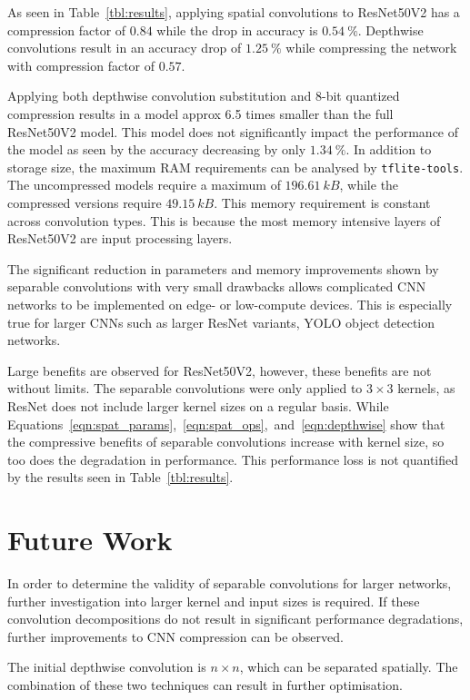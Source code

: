 \documentclass{article}
\begin{document}
	As seen in Table~\ref{tbl:results}, applying spatial convolutions to ResNet50V2 has a compression factor of $0.84$ while the drop in accuracy is $0.54~\%$. Depthwise convolutions result in an accuracy drop of $1.25~\%$ while compressing the network with compression factor of $0.57$.
	
	Applying both depthwise convolution substitution and 8-bit quantized compression results in a model approx 6.5 times smaller than the full ResNet50V2 model. This model does not significantly impact the performance of the model as seen by the accuracy decreasing by only $1.34~\%$. In addition to storage size, the maximum RAM requirements can be analysed by \verb|tflite-tools|. %
	The uncompressed models require a maximum of $196.61~kB$, while the compressed versions require $49.15~kB$. This memory requirement is constant across convolution types. This is because the most memory intensive layers of ResNet50V2 are input processing layers.
	
	The significant reduction in parameters and memory improvements shown by separable convolutions with very small drawbacks allows complicated CNN networks to be implemented on edge- or low-compute devices. This is especially true for larger CNNs such as larger ResNet variants, YOLO object detection networks.
	
	Large benefits are observed for ResNet50V2, however, these benefits are not without limits. The separable convolutions were only applied to $3 \times 3$ kernels, as ResNet does not include larger kernel sizes on a regular basis. While Equations~\ref{eqn:spat_params},~\ref{eqn:spat_ops},~and~\ref{eqn:depthwise} show that the compressive benefits of separable convolutions increase with kernel size, so too does the degradation in performance. This performance loss is not quantified by the results seen in Table~\ref{tbl:results}.
	
	\section{Future Work}
	
	In order to determine the validity of separable convolutions for larger networks, further investigation into larger kernel and input sizes is required. If these convolution decompositions do not result in significant performance degradations, further improvements to CNN compression can be observed.

	The initial depthwise convolution is $n \times n$, which can be separated spatially. The combination of these two techniques can result in further optimisation.
	
\end{document}
